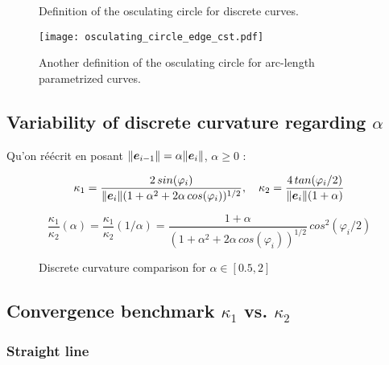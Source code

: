 \begin{figure}[h]
     \centering
     \caption{Definition of the osculating circle for discrete curves.}
     \label{steady_state}
\end{figure}

\begin{figure}[H]
\begin{center}
\texttt{[image: osculating\_circle\_edge\_cst.pdf]}
\caption{Another definition of the osculating circle for arc-length parametrized curves.}
\label{fig:1_1}
\end{center}
\end{figure}

\subsection{Variability of discrete curvature regarding $\alpha$}

Qu'on réécrit en posant $\|\boldsymbol{e}_{i-1}\| = \alpha \|\boldsymbol{e}_{i} \|$, $\alpha \geq 0$ :

\begin{equation}
	\kappa_1 = \frac{2 \,sin(\varphi_i)}{\|\boldsymbol{e}_{i}\|(1+ \alpha^2 + 2 \alpha \, cos(\varphi_i))^{1/2}},
	\quad
	\kappa_2 = \frac{4 \,tan(\varphi_i/2)}{\|\boldsymbol{e}_{i}\|(1+\alpha)}
\end{equation}

\begin{equation}
	\frac{\kappa_1}{\kappa_2}(\alpha) = \frac{\kappa_1}{\kappa_2}(1/\alpha)= \frac{1+\alpha}{(1+ \alpha^2 + 2 \alpha \, cos(\varphi_i))^{1/2}} \, cos^2(\varphi_i/2)
\end{equation}

\begin{figure}[H]
\begin{center}

\end{center}
\caption{Discrete curvature comparison for $\alpha \in [0.5,2]$}
\end{figure}

\subsection{Convergence benchmark $\kappa_1$ vs. $\kappa_2$}

\subsubsection{Straight line}

